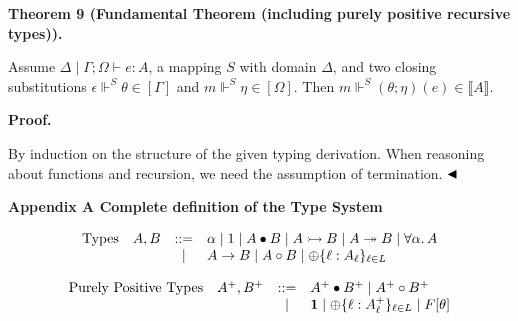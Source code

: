  
 
\par\medskip\noindent\textbf{Theorem 9 (Fundamental Theorem (including purely positive recursive types)).}\par
 
 
Assume $\Delta\mid\Gamma\mathrel{;}\Omega\vdash e:A$, a mapping $S$ with domain $\Delta$, and two closing substitutions $\epsilon\Vdash^{S}\theta\in[\Gamma]$ and $m\Vdash^{S}\eta\in[\Omega]$. Then $m\Vdash^{S}(\theta\mathrel{;}\eta)(e)\in\llbracket A\rrbracket$.\par
 
 
 
 
 
\par\medskip\noindent\textbf{Proof.}\par
 
 
By induction on the structure of the given typing derivation. When reasoning about functions and recursion, we need the assumption of termination. $\hfill\blacktriangleleft$\par
 
 
 


 
\par\medskip\noindent\textbf{Appendix A Complete definition of the Type System}\par
 
  
\par  \quad  \[\begin{array}[]{llcll}\mbox{Types}&A,B&::=&\alpha\mid 1\mid A\bullet B\mid A\rightarrowtail B\mid A\twoheadrightarrow B\mid\forall\alpha.\,A\\
&&\mid&A\to B\mid A\circ B\mid\oplus\{\ell:A_{\ell}\}_{\ell\in L}\end{array}\]\quad  \quad  
   
\par  \quad  \[\begin{array}[]{llcl}\mbox{Purely Positive Types}&A^{+},B^{+}&::=&A^{+}\bullet
B^{+}\mid A^{+}\circ B^{+}\\
&&\mid&\mathbf{1}\mid\oplus\{\ell:A^{+}_{\ell}\}_{\ell\in L}\mid F[\theta]\end{array}\]\quad  \quad  
   
